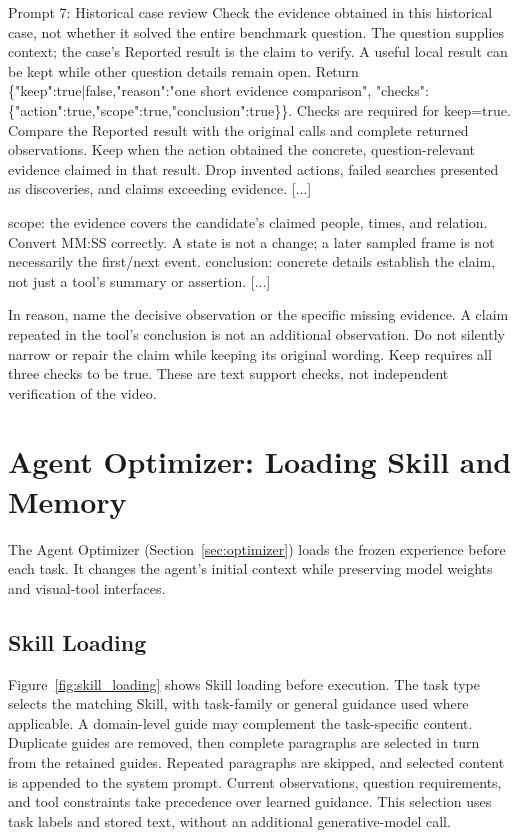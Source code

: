 \begin{AppendixPrompt}{Prompt 7: Historical case review}
Check the evidence obtained in this historical case, not whether it solved the entire benchmark question. The question supplies context; the case's Reported result is the claim to verify. A useful local result can be kept while other question details remain open. Return \{"keep":true|false,"reason":"one short evidence comparison", "checks":\{"action":true,"scope":true,"conclusion":true\}\}. Checks are required for keep=true. Compare the Reported result with the original calls and complete returned observations. Keep when the action obtained the concrete, question-relevant evidence claimed in that result. Drop invented actions, failed searches presented as discoveries, and claims exceeding evidence. [...]

scope: the evidence covers the candidate's claimed people, times, and relation. Convert MM:SS correctly. A state is not a change; a later sampled frame is not necessarily the first/next event. conclusion: concrete details establish the claim, not just a tool's summary or assertion. [...]

In reason, name the decisive observation or the specific missing evidence. A claim repeated in the tool's conclusion is not an additional observation. Do not silently narrow or repair the claim while keeping its original wording. Keep requires all three checks to be true. These are text support checks, not independent verification of the video.
\end{AppendixPrompt}

\section{Agent Optimizer: Loading Skill and Memory}
\label{app:optimizer}

The Agent Optimizer (Section~\ref{sec:optimizer}) loads the frozen experience before each task. It changes the agent's initial context while preserving model weights and visual-tool interfaces.

\subsection{Skill Loading}
\label{app:skill_loading}

Figure~\ref{fig:skill_loading} shows Skill loading before execution. The task type selects the matching Skill, with task-family or general guidance used where applicable. A domain-level guide may complement the task-specific content. Duplicate guides are removed, then complete paragraphs are selected in turn from the retained guides. Repeated paragraphs are skipped, and selected content is appended to the system prompt. Current observations, question requirements, and tool constraints take precedence over learned guidance. This selection uses task labels and stored text, without an additional generative-model call.


